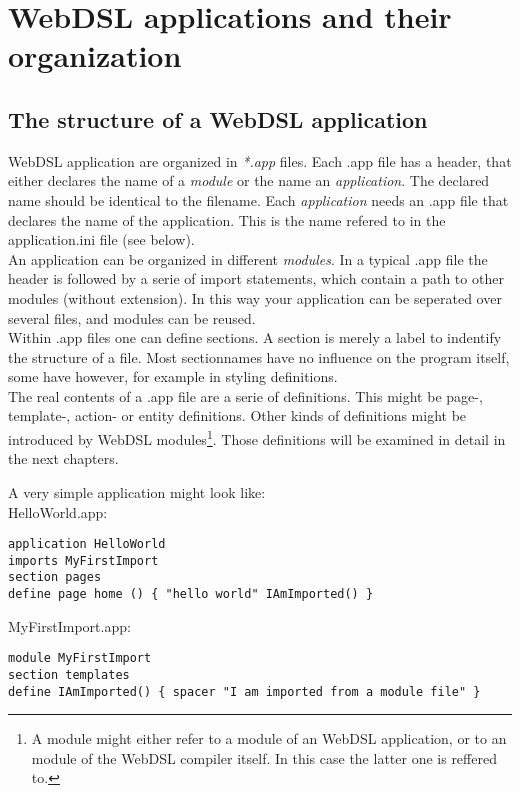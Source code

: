 \chapter{WebDSL applications and their organization}

\section{The structure of a WebDSL application}
WebDSL application are organized in \emph{*.app} files. Each .app file has a header, that either declares the name of a \emph{module} or the name an \emph{application}. The declared name should be identical to the filename. Each \emph{application} needs an .app file that declares the name of the application. This is the name refered to in the application.ini file (see below). 
\\
An application can be organized in different \emph{modules}. In a typical .app file the header is followed by a serie of import statements, which contain a path to other modules (without extension). In this way your application can be seperated over several files, and modules can be reused. 
\\
Within .app files one can define sections. A section is merely a label to indentify the structure of a file. Most sectionnames have no influence on the program itself, some have however, for example in styling definitions. 
\\
The real contents of a .app file are a serie of definitions. This might be page-, template-, action- or entity definitions. Other kinds of definitions might be introduced by WebDSL modules\footnote{A module might either refer to a module of an WebDSL application, or to an module of the WebDSL compiler itself. In this case the latter one is reffered to.}. Those definitions will be examined in detail in the next chapters. 

A very simple application might look like:
\\HelloWorld.app:
\begin{lstlisting}
application HelloWorld
imports MyFirstImport
section pages
define page home () { "hello world" IAmImported() }
\end{lstlisting}

MyFirstImport.app:
\begin{lstlisting}
module MyFirstImport
section templates
define IAmImported() { spacer "I am imported from a module file" }

\end{lstlisting}

